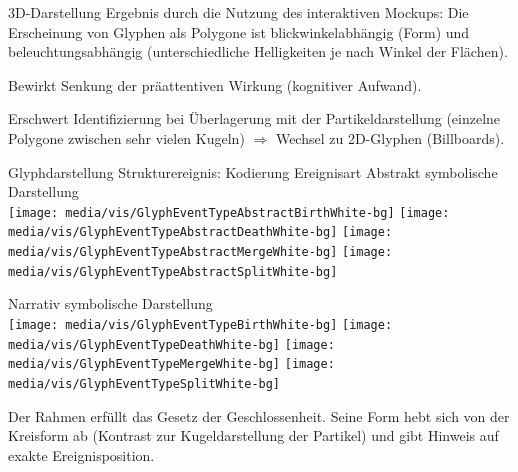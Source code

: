 \documentclass[10pt]{beamer}
\begin{document}
\begin{frame}{3D-Darstellung}
	Ergebnis durch die Nutzung des interaktiven Mockups: Die Erscheinung von Glyphen als Polygone ist blickwinkelabhängig (Form) und beleuchtungsabhängig (unterschiedliche Helligkeiten je nach Winkel der Flächen).
	
	Bewirkt Senkung der präattentiven Wirkung (kognitiver Aufwand). %
	
	Erschwert Identifizierung bei Überlagerung mit der Partikeldarstellung (einzelne Polygone zwischen sehr vielen Kugeln) $\Rightarrow$ Wechsel zu 2D-Glyphen (Billboards).
\end{frame}

\begin{frame}{Glyphdarstellung Strukturereignis: Kodierung Ereignisart}
	Abstrakt symbolische Darstellung\\
					\texttt{[image: media/vis/GlyphEventTypeAbstractBirthWhite-bg]}
					\hspace*{.06\textwidth}%
					\texttt{[image: media/vis/GlyphEventTypeAbstractDeathWhite-bg]}
					\hspace*{.06\textwidth}%
					\texttt{[image: media/vis/GlyphEventTypeAbstractMergeWhite-bg]}
					\hspace*{.06\textwidth}%
					\texttt{[image: media/vis/GlyphEventTypeAbstractSplitWhite-bg]}
					
	Narrativ symbolische Darstellung\\
					\texttt{[image: media/vis/GlyphEventTypeBirthWhite-bg]}
					\hspace*{.06\textwidth}%
					\texttt{[image: media/vis/GlyphEventTypeDeathWhite-bg]}
					\hspace*{.06\textwidth}%
					\texttt{[image: media/vis/GlyphEventTypeMergeWhite-bg]}
					\hspace*{.06\textwidth}%
					\texttt{[image: media/vis/GlyphEventTypeSplitWhite-bg]}
					
	Der Rahmen erfüllt das Gesetz der Geschlossenheit. Seine Form hebt sich von der Kreisform ab (Kontrast zur Kugeldarstellung der Partikel) und gibt Hinweis auf exakte Ereignisposition.
\end{frame}
\end{document}
